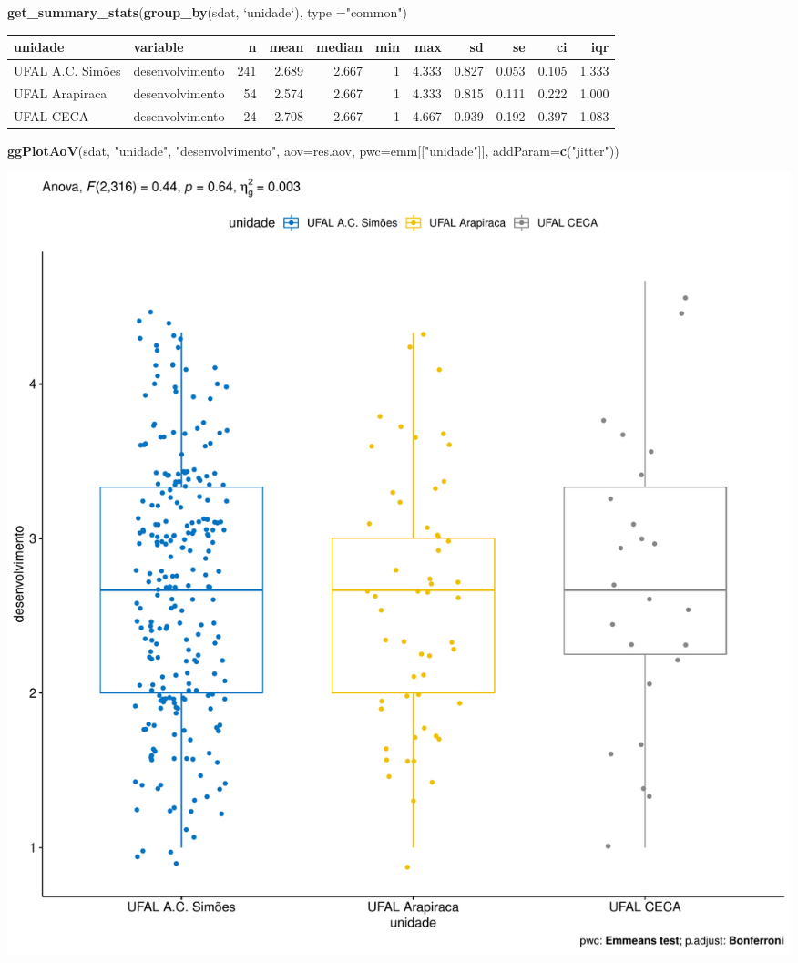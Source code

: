 \documentclass[]{article}
\newenvironment{Shaded}{\begin{snugshade}}{\end{snugshade}}
\newcommand{\DataTypeTok}[1]{\textcolor[rgb]{0.13,0.29,0.53}{#1}}
\newcommand{\KeywordTok}[1]{\textcolor[rgb]{0.13,0.29,0.53}{\textbf{#1}}}
\newcommand{\NormalTok}[1]{#1}
\newcommand{\StringTok}[1]{\textcolor[rgb]{0.31,0.60,0.02}{#1}}
\begin{document}
\begin{Shaded}
\begin{Highlighting}[]
\KeywordTok{get_summary_stats}\NormalTok{(}\KeywordTok{group_by}\NormalTok{(sdat, }\StringTok{`}\DataTypeTok{unidade}\StringTok{`}\NormalTok{), }\DataTypeTok{type =}\StringTok{"common"}\NormalTok{)}
\end{Highlighting}
\end{Shaded}

\begin{longtable}[]{@{}llrrrrrrrrr@{}}
\toprule
unidade & variable & n & mean & median & min & max & sd & se & ci &
iqr\tabularnewline
\midrule
\endhead
UFAL A.C. Simões & desenvolvimento & 241 & 2.689 & 2.667 & 1 & 4.333 &
0.827 & 0.053 & 0.105 & 1.333\tabularnewline
UFAL Arapiraca & desenvolvimento & 54 & 2.574 & 2.667 & 1 & 4.333 &
0.815 & 0.111 & 0.222 & 1.000\tabularnewline
UFAL CECA & desenvolvimento & 24 & 2.708 & 2.667 & 1 & 4.667 & 0.939 &
0.192 & 0.397 & 1.083\tabularnewline
\bottomrule
\end{longtable}

\begin{Shaded}
\begin{Highlighting}[]
\KeywordTok{ggPlotAoV}\NormalTok{(sdat, }\StringTok{"unidade"}\NormalTok{, }\StringTok{"desenvolvimento"}\NormalTok{, }\DataTypeTok{aov=}\NormalTok{res.aov, }\DataTypeTok{pwc=}\NormalTok{emm[[}\StringTok{"unidade"}\NormalTok{]], }\DataTypeTok{addParam=}\KeywordTok{c}\NormalTok{(}\StringTok{"jitter"}\NormalTok{))}
\end{Highlighting}
\end{Shaded}

\includegraphics{factorialAnova_files/figure-latex/unnamed-chunk-24-1.pdf}
\end{document}

